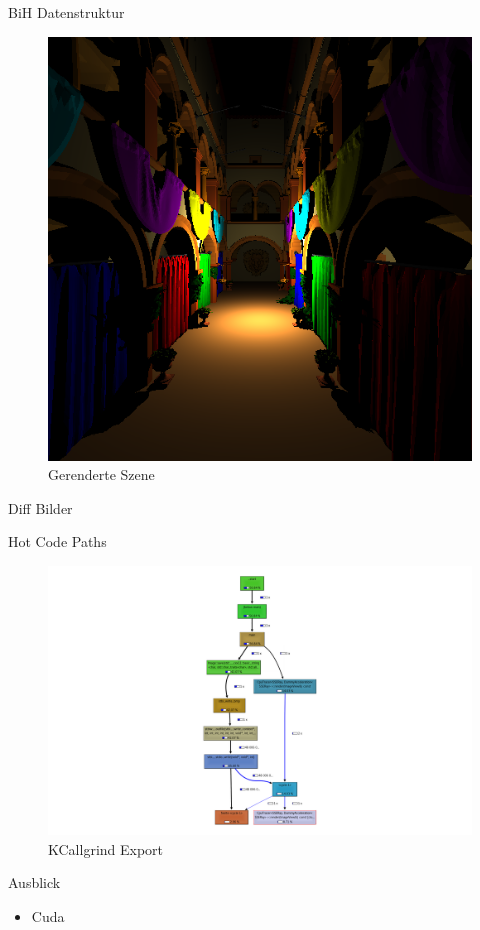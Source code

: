 \begin{frame}{BiH Datenstruktur}
\begin{figure}[ht]
\begin{minipage}[b]{0.45\linewidth}
            \includegraphics[width=\textwidth]{images/sponza.png}
            \caption{Gerenderte Szene}
            \label{fig:b}
        \end{minipage}
    \end{figure}
	\end{frame}

	\begin{frame}{Diff Bilder}
	\end{frame}

	\begin{frame}{Hot Code Paths}
		\begin{figure}[ht]
        	\begin{minipage}[b]{0.7\linewidth}
            \centering
            \includegraphics[width=\textwidth]{images/callgrind2.png}
            \caption{KCallgrind Export}
            \label{fig:a}
        	\end{minipage}
	\end{figure}
	\end{frame}

	\begin{frame}{Ausblick}
		\begin{itemize}
			\item Cuda
		\end{itemize}
	\end{frame}


